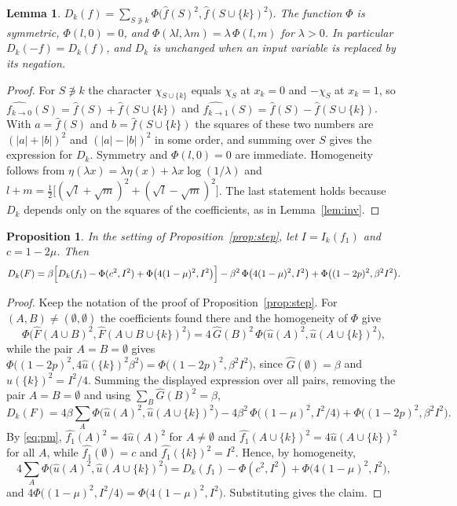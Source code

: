 \documentclass[11pt]{amsart}
\newtheorem{lemma}[theorem]{Lemma}
\newtheorem{proposition}[theorem]{Proposition}
\theoremstyle{definition}\newtheorem{definition}[theorem]{Definition}
\theoremstyle{remark}\newtheorem{remark}[theorem]{Remark}
\newcommand{\hf}{\widehat{f}}
\begin{document}
\begin{lemma}\label{lem:split}
$D_k(f)=\sum_{S\not\ni k}\Phi\bigl(\hf(S)^2,\hf(S\cup\{k\})^2\bigr)$. The function $\Phi$ is symmetric,
$\Phi(l,0)=0$, and $\Phi(\lambda l,\lambda m)=\lambda\,\Phi(l,m)$ for $\lambda>0$. In particular $D_k(-f)=D_k(f)$, and
$D_k$ is unchanged when an input variable is replaced by its negation.
\end{lemma}

\begin{proof}
For $S\not\ni k$ the character $\chi_{S\cup\{k\}}$ equals $\chi_S$ at $x_k=0$ and $-\chi_S$ at $x_k=1$, so
$\widehat{f_{k\to0}}(S)=\hf(S)+\hf(S\cup\{k\})$ and $\widehat{f_{k\to1}}(S)=\hf(S)-\hf(S\cup\{k\})$. With
$a=\hf(S)$ and $b=\hf(S\cup\{k\})$ the squares of these two numbers are $(|a|+|b|)^2$ and $(|a|-|b|)^2$ in some order,
and summing over $S$ gives the expression for $D_k$. Symmetry and $\Phi(l,0)=0$ are immediate. Homogeneity follows
from $\eta(\lambda x)=\lambda\eta(x)+\lambda x\log(1/\lambda)$ and
$l+m=\frac12\bigl[(\sqrt l+\sqrt m)^2+(\sqrt l-\sqrt m)^2\bigr]$. The last statement holds because $D_k$ depends only on
the squares of the coefficients, as in Lemma~\ref{lem:inv}.
\end{proof}

\begin{proposition}\label{prop:stepD}
In the setting of Proposition~\ref{prop:step}, let $I=I_k(f_1)$ and $c=1-2\mu$. Then
\[
D_k(F)=\beta\Bigl[D_k(f_1)-\Phi(c^2,I^2)+\Phi\bigl(4(1-\mu)^2,I^2\bigr)\Bigr]-\beta^2\,\Phi\bigl(4(1-\mu)^2,I^2\bigr)
+\Phi\bigl((1-2p)^2,\beta^2I^2\bigr).
\]
\end{proposition}

\begin{proof}
Keep the notation of the proof of Proposition~\ref{prop:step}. For $(A,B)\ne(\emptyset,\emptyset)$ the coefficients
found there and the homogeneity of $\Phi$ give
\[
\Phi\bigl(\widehat F(A\cup B)^2,\widehat F(A\cup B\cup\{k\})^2\bigr)=4\,\widehat G(B)^2\,
\Phi\bigl(\widehat u(A)^2,\widehat u(A\cup\{k\})^2\bigr),
\]
while the pair $A=B=\emptyset$ gives $\Phi\bigl((1-2p)^2,4\widehat u(\{k\})^2\beta^2\bigr)=\Phi\bigl((1-2p)^2,\beta^2I^2\bigr)$,
since $\widehat G(\emptyset)=\beta$ and $\widehat u(\{k\})^2=I^2/4$. Summing the displayed expression over all pairs,
removing the pair $A=B=\emptyset$ and using $\sum_B\widehat G(B)^2=\beta$,
\[
D_k(F)=4\beta\sum_A\Phi\bigl(\widehat u(A)^2,\widehat u(A\cup\{k\})^2\bigr)-4\beta^2\,\Phi\bigl((1-\mu)^2,I^2/4\bigr)
+\Phi\bigl((1-2p)^2,\beta^2I^2\bigr).
\]
By \eqref{eq:pm}, $\widehat{f_1}(A)^2=4\widehat u(A)^2$ for $A\ne\emptyset$ and
$\widehat{f_1}(A\cup\{k\})^2=4\widehat u(A\cup\{k\})^2$ for all $A$, while $\widehat{f_1}(\emptyset)=c$ and
$\widehat{f_1}(\{k\})^2=I^2$. Hence, by homogeneity,
\[
4\sum_A\Phi\bigl(\widehat u(A)^2,\widehat u(A\cup\{k\})^2\bigr)=D_k(f_1)-\Phi(c^2,I^2)+\Phi\bigl(4(1-\mu)^2,I^2\bigr),
\]
and $4\Phi\bigl((1-\mu)^2,I^2/4\bigr)=\Phi\bigl(4(1-\mu)^2,I^2\bigr)$. Substituting gives the claim.
\end{proof}
\end{document}
